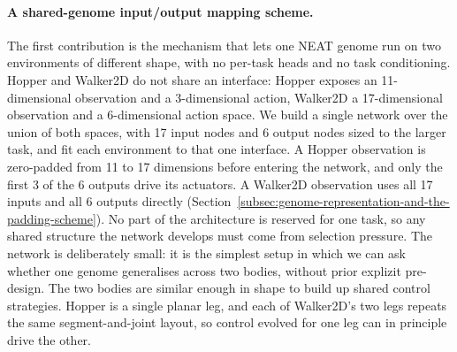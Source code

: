 \documentclass[12pt]{article}
\begin{document}
\paragraph{A shared-genome input/output mapping scheme.}
The first contribution is the mechanism that lets one NEAT genome run on two environments of different shape, with no per-task heads and no task conditioning.
Hopper and Walker2D do not share an interface: Hopper exposes an 11-dimensional observation and a 3-dimensional action, Walker2D a 17-dimensional observation and a 6-dimensional action space.
We build a single network over the union of both spaces, with 17 input nodes and 6 output nodes sized to the larger task, and fit each environment to that one interface.
A Hopper observation is zero-padded from 11 to 17 dimensions before entering the network, and only the first 3 of the 6 outputs drive its actuators. A Walker2D observation uses all 17 inputs and all 6 outputs directly (Section~\ref{subsec:genome-representation-and-the-padding-scheme}).
No part of the architecture is reserved for one task, so any shared structure the network develops must come from selection pressure.
The network is deliberately small: it is the simplest setup in which we can ask whether one genome generalises across two bodies, without prior explizit pre-design.
The two bodies are similar enough in shape to build up shared control strategies.
Hopper is a single planar leg, and each of Walker2D's two legs repeats the same segment-and-joint layout, so control evolved for one leg can in principle drive the other.
\end{document}

